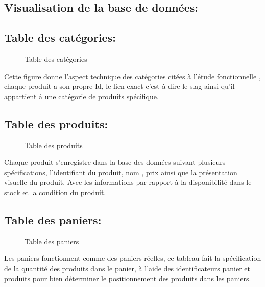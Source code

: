 \documentclass[a4paper]{report}
\begin{document}
\begin{doublespace}
\begin{doublespace}
\begin{doublespace}
\begin{doublespace}
\begin{doublespace}
                    \section{ Visualisation de la base de données:}
                    \subsection{ Table des catégories: }
                    \begin{figure}[H]
                        \caption{Table des catégories}
                    \end{figure}
                    Cette figure donne l'aspect technique des catégories
                    citées à l'étude
                    fonctionnelle , chaque produit a son propre Id, le lien
                    exact c'est à dire le slag ainsi qu'il appartient à une catégorie de produits
                    spécifique.
                    \subsection{ Table des produits: }
                    \begin{figure}[H]

                        \caption{Table des produits}
                    \end{figure}
                    Chaque produit s'enregistre dans la base des données
                    suivant plusieurs spécifications, l'identifiant du produit, nom , prix ainsi
                    que la présentation visuelle du produit. Avec les informations par rapport à la
                    disponibilité dans le stock et la condition du produit.
                    \subsection{ Table des paniers: }
                    \begin{figure}[H]

                        \caption{Table des paniers}
                    \end{figure}
                    Les paniers fonctionnent comme des paniers réelles, ce
                    tableau fait la spécification de la quantité des produits dans le panier,  à
                    l'aide des identificateurs panier et produits pour bien déterminer le
                    positionnement des produits dans les paniers.

\end{doublespace}
\end{doublespace}
\end{doublespace}
\end{doublespace}
\end{doublespace}
\end{document}

